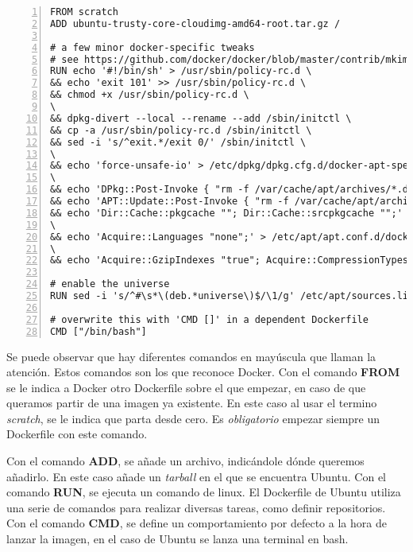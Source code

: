 	\begin{lstlisting}[style=consola,numbers=left]
FROM scratch
ADD ubuntu-trusty-core-cloudimg-amd64-root.tar.gz /

# a few minor docker-specific tweaks
# see https://github.com/docker/docker/blob/master/contrib/mkimage/debootstrap
RUN echo '#!/bin/sh' > /usr/sbin/policy-rc.d \
&& echo 'exit 101' >> /usr/sbin/policy-rc.d \
&& chmod +x /usr/sbin/policy-rc.d \
\
&& dpkg-divert --local --rename --add /sbin/initctl \
&& cp -a /usr/sbin/policy-rc.d /sbin/initctl \
&& sed -i 's/^exit.*/exit 0/' /sbin/initctl \
\
&& echo 'force-unsafe-io' > /etc/dpkg/dpkg.cfg.d/docker-apt-speedup \
\
&& echo 'DPkg::Post-Invoke { "rm -f /var/cache/apt/archives/*.deb /var/cache/apt/archives/partial/*.deb /var/cache/apt/*.bin || true"; };' > /etc/apt/apt.conf.d/docker-clean \
&& echo 'APT::Update::Post-Invoke { "rm -f /var/cache/apt/archives/*.deb /var/cache/apt/archives/partial/*.deb /var/cache/apt/*.bin || true"; };' >> /etc/apt/apt.conf.d/docker-clean \
&& echo 'Dir::Cache::pkgcache ""; Dir::Cache::srcpkgcache "";' >> /etc/apt/apt.conf.d/docker-clean \
\
&& echo 'Acquire::Languages "none";' > /etc/apt/apt.conf.d/docker-no-languages \
\
&& echo 'Acquire::GzipIndexes "true"; Acquire::CompressionTypes::Order:: "gz";' > /etc/apt/apt.conf.d/docker-gzip-indexes

# enable the universe
RUN sed -i 's/^#\s*\(deb.*universe\)$/\1/g' /etc/apt/sources.list

# overwrite this with 'CMD []' in a dependent Dockerfile
CMD ["/bin/bash"]
	\end{lstlisting}

	Se puede observar que hay diferentes comandos en mayúscula que llaman la atención. Estos comandos son los que reconoce Docker. Con el comando \textbf{FROM} se le indica a Docker otro Dockerfile sobre el que empezar, en caso de que queramos partir de una imagen ya existente. En este caso al usar el termino \textit{scratch}, se le indica que parta desde cero. Es \emph{obligatorio} empezar siempre un Dockerfile con este comando.
	
	Con el comando \textbf{ADD}, se añade un archivo, indicándole dónde queremos añadirlo. En este caso añade un \textit{tarball} en el que se encuentra Ubuntu. Con el comando \textbf{RUN}, se ejecuta un comando de linux. El Dockerfile de Ubuntu utiliza una serie de comandos para realizar diversas tareas, como definir repositorios. Con el comando \textbf{CMD}, se define un comportamiento por defecto a la hora de lanzar la imagen, en el caso de Ubuntu se lanza una terminal en bash.
	
